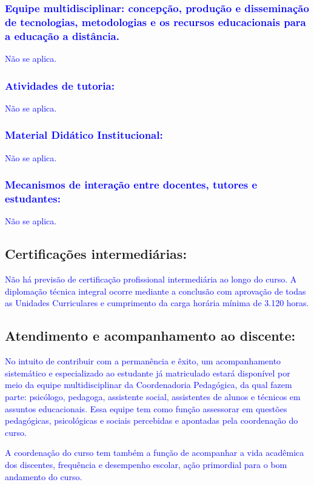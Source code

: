 \documentclass{../../modelos/latex-shared/ifsc-ppc}
\newcommand{\revisao}[1]{\textcolor{blue}{#1}}
\newcommand{\revisao}[1]{#1}
\begin{document}
\subsubsection{\revisao{Equipe multidisciplinar: concepção, produção e disseminação de tecnologias, metodologias e os recursos educacionais para a educação a distância.}}
\revisao{Não se aplica.}

\subsubsection{\revisao{Atividades de tutoria:}}
\revisao{Não se aplica.}

\subsubsection{\revisao{Material Didático Institucional:}}
\revisao{Não se aplica.}

\subsubsection{\revisao{Mecanismos de interação entre docentes, tutores e estudantes:}}
\revisao{Não se aplica.}

\subsection{Certificações intermediárias:}
\revisao{Não há previsão de certificação profissional intermediária ao longo do curso. A diplomação técnica integral ocorre mediante a conclusão com aprovação de todas as Unidades Curriculares e cumprimento da carga horária mínima de 3.120 horas.}

\subsection{Atendimento e acompanhamento ao discente:}
\revisao{No intuito de contribuir com a permanência e êxito, um acompanhamento sistemático e especializado ao estudante já matriculado estará disponível por meio da equipe multidisciplinar da Coordenadoria Pedagógica, da qual fazem parte: psicólogo, pedagoga, assistente social, assistentes de alunos e técnicos em assuntos educacionais. Essa equipe tem como função assessorar em questões pedagógicas, psicológicas e sociais percebidas e apontadas pela coordenação do curso.}

\revisao{A coordenação do curso tem também a função de acompanhar a vida acadêmica dos discentes, frequência e desempenho escolar, ação primordial para o bom andamento do curso.}
\end{document}
